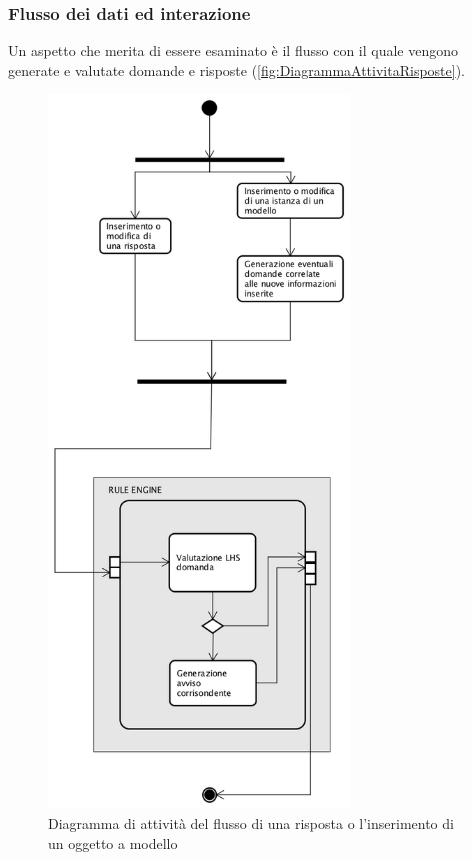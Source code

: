 \subsubsection{Flusso dei dati ed interazione}
 Un aspetto che merita di essere esaminato è il flusso con il quale vengono generate e valutate domande e risposte  (\autoref{fig:DiagrammaAttivitaRisposte}).
\begin{figure}[H]
	\begin{center}
		\includegraphics[width=8cm]{Pics/diagramma_attivita_risposte.png}
		\caption{Diagramma di attività del flusso di una risposta o l'inserimento di un oggetto a modello}
		\label{fig:DiagrammaAttivitaRisposte}
	\end{center}
\end{figure}

